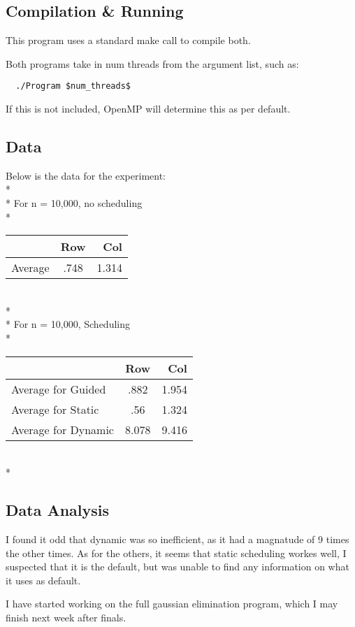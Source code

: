 \documentclass[dvips]{article}
\begin{document}
\subsection{Compilation \& Running}
 This program uses a standard make call to compile both.

 Both programs take in num threads from the argument list, such as:
 \begin{verbatim}
  ./Program $num_threads$
  \end{verbatim}

 If this is not included, OpenMP will determine this as per default.

\subsection{Data}
Below is the data for the experiment:
\\*
\\*
For n = 10,000, no scheduling
\\*
\begin{tabular}{ l | c r }
   & Row & Col \\
  \hline
  Average & .748 &  1.314\\
  \hline

\end{tabular}
\\*
\\*
For n = 10,000, Scheduling
\\*
\begin{tabular}{ l | c r }
   & Row & Col \\
  \hline
  Average for Guided & .882 &  1.954\\
  \hline
   Average for Static & .56 &  1.324\\
  \hline
   Average for Dynamic & 8.078 &  9.416\\
  \hline
\end{tabular}
\\*
\subsection{Data Analysis}

I found it odd that dynamic was so inefficient, as it had a magnatude of 9 times the other times. 
As for the others, it seems that static scheduling workes well, I suspected that it is the default, but was
unable to find any information on what it uses as default.

I have started working on the full gaussian elimination program, which I may finish next week after finals.
\end{document}
